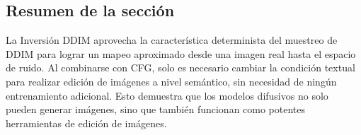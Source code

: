 \subsection{Resumen de la sección}

La Inversión DDIM aprovecha la característica determinista del muestreo de DDIM para lograr un mapeo aproximado desde una imagen real hasta el espacio de ruido. Al combinarse con CFG, solo es necesario cambiar la condición textual para realizar edición de imágenes a nivel semántico, sin necesidad de ningún entrenamiento adicional. Esto demuestra que los modelos difusivos no solo pueden generar imágenes, sino que también funcionan como potentes herramientas de edición de imágenes.

\newpage
